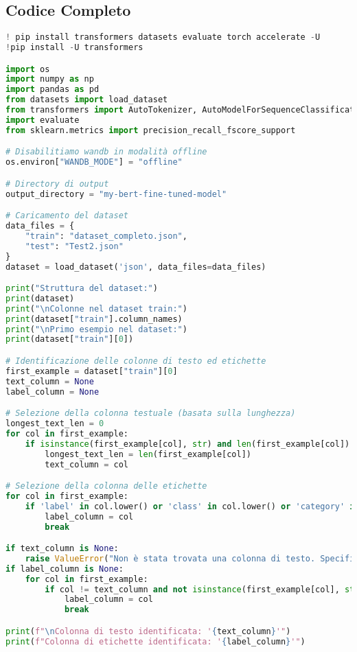 \documentclass[a4paper,12pt]{article}
\begin{document}
\subsection*{Codice Completo}
\begin{lstlisting}[language=Python, caption={Versione Finale --- Codice Completo}]
! pip install transformers datasets evaluate torch accelerate -U
!pip install -U transformers

import os
import numpy as np
import pandas as pd
from datasets import load_dataset
from transformers import AutoTokenizer, AutoModelForSequenceClassification, TrainingArguments, Trainer, TrainerCallback
import evaluate
from sklearn.metrics import precision_recall_fscore_support

# Disabilitiamo wandb in modalità offline
os.environ["WANDB_MODE"] = "offline"

# Directory di output
output_directory = "my-bert-fine-tuned-model"

# Caricamento del dataset
data_files = {
    "train": "dataset_completo.json",
    "test": "Test2.json"
}
dataset = load_dataset('json', data_files=data_files)

print("Struttura del dataset:")
print(dataset)
print("\nColonne nel dataset train:")
print(dataset["train"].column_names)
print("\nPrimo esempio nel dataset:")
print(dataset["train"][0])

# Identificazione delle colonne di testo ed etichette
first_example = dataset["train"][0]
text_column = None
label_column = None

# Selezione della colonna testuale (basata sulla lunghezza)
longest_text_len = 0
for col in first_example:
    if isinstance(first_example[col], str) and len(first_example[col]) > longest_text_len:
        longest_text_len = len(first_example[col])
        text_column = col

# Selezione della colonna delle etichette
for col in first_example:
    if 'label' in col.lower() or 'class' in col.lower() or 'category' in col.lower():
        label_column = col
        break

if text_column is None:
    raise ValueError("Non è stata trovata una colonna di testo. Specifica manualmente il nome della colonna.")
if label_column is None:
    for col in first_example:
        if col != text_column and not isinstance(first_example[col], str):
            label_column = col
            break

print(f"\nColonna di testo identificata: '{text_column}'")
print(f"Colonna di etichette identificata: '{label_column}'")


\end{lstlisting}
\end{document}
